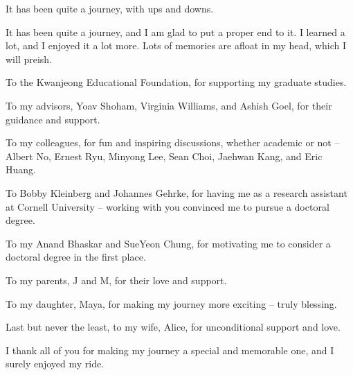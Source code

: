 It has been quite a journey, with ups and downs.

It has been quite a journey, and I am glad to put a proper end to it. 
I learned a lot, and I enjoyed it a lot more. 
Lots of memories are afloat in my head, which I will preish. 


To the Kwanjeong Educational Foundation, for supporting my graduate studies.

To my advisors, Yoav Shoham, Virginia Williams, and Ashish Goel, for their guidance and support.

To my colleagues, for fun and inspiring discussions, whether academic or not -- Albert No, Ernest Ryu, Minyong Lee, Sean Choi, Jaehwan Kang, and Eric Huang.

To Bobby Kleinberg and Johannes Gehrke, for having me as a research assistant at Cornell University -- working with you convinced me to pursue a doctoral degree.

To my Anand Bhaskar and SueYeon Chung, for motivating me to consider a doctoral degree in the first place.

To my parents, J and M, for their love and support.

To my daughter, Maya, for making my journey more exciting -- truly blessing.

Last but never the least, to my wife, Alice, for unconditional support and love.

I thank all of you for making my journey a special and memorable one, and I surely enjoyed my ride.


